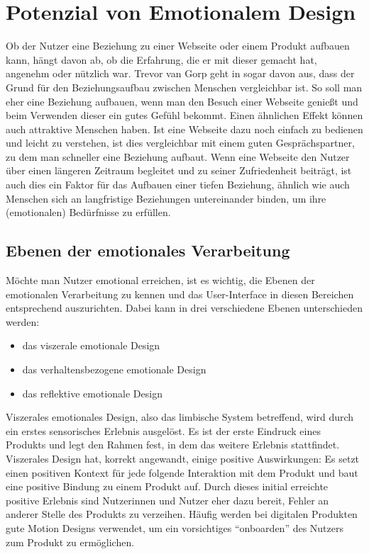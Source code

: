 \documentclass[./dokumentation.tex]{subfiles}
\begin{document}
\chapter{Potenzial von Emotionalem Design}
Ob der Nutzer eine Beziehung zu einer Webseite oder einem Produkt aufbauen kann, hängt davon ab, ob die Erfahrung, die er mit dieser gemacht hat, angenehm oder nützlich war. Trevor van Gorp geht in \cite{vanGorp2013} sogar davon aus, dass der Grund für den Beziehungsaufbau zwischen Menschen vergleichbar ist. So soll man eher eine Beziehung aufbauen, wenn man den Besuch einer Webseite genießt und beim Verwenden dieser ein gutes Gefühl bekommt. Einen ähnlichen Effekt können auch attraktive Menschen haben. Ist eine Webseite dazu noch einfach zu bedienen und leicht zu verstehen, ist dies vergleichbar mit einem guten Gesprächspartner, zu dem man schneller eine Beziehung aufbaut. Wenn eine Webseite den Nutzer über einen längeren Zeitraum begleitet und zu seiner Zufriedenheit beiträgt, ist auch dies ein Faktor für das Aufbauen einer tiefen Beziehung, ähnlich wie auch Menschen sich an langfristige Beziehungen untereinander binden, um ihre (emotionalen) Bedürfnisse zu erfüllen. \cite{vanGorp2013}

\section{Ebenen der emotionales Verarbeitung}
Möchte man Nutzer emotional erreichen, ist es wichtig, die Ebenen der emotionalen Verarbeitung zu kennen und das User-Interface in diesen Bereichen entsprechend auszurichten. Dabei kann in drei verschiedene Ebenen unterschieden werden:
\begin{itemize}
    \item das viszerale emotionale Design
    \item das verhaltensbezogene emotionale Design
    \item das reflektive emotionale Design
    
\end{itemize}

Viszerales emotionales Design, also das limbische System betreffend, wird durch ein erstes sensorisches Erlebnis ausgelöst. Es ist der erste Eindruck eines Produkts und legt den Rahmen fest, in dem das weitere Erlebnis stattfindet. Viszerales Design hat, korrekt angewandt, einige positive Auswirkungen: Es setzt einen positiven Kontext für jede folgende Interaktion mit dem Produkt und baut eine positive Bindung zu einem Produkt auf. Durch dieses initial erreichte positive Erlebnis sind Nutzerinnen und Nutzer eher dazu bereit, Fehler an anderer Stelle des Produkts zu verzeihen.
Häufig werden bei digitalen Produkten gute Motion Designs verwendet, um ein vorsichtiges “onboarden” des Nutzers zum Produkt zu ermöglichen.  
\end{document}
